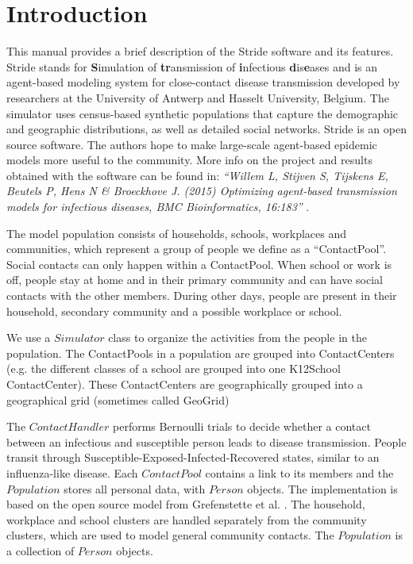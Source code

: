 \chapter{Introduction}
\label{chap:Introduction}
  
This manual provides a brief description of the Stride software and its
features. 
Stride stands for \textbf{S}imulation of \textbf{tr}ansmission 
 of \textbf{i}nfectious \textbf{d}is\textbf{e}ases and is an agent-based modeling 
system for close-contact disease transmission developed by researchers at the
University of Antwerp and Hasselt University, Belgium.
The simulator uses census-based synthetic populations
that capture the demographic and geographic distributions, as well as detailed social networks.
Stride is an open source software. The authors hope to make large-scale
agent-based epidemic models more useful to the community.
More info on the project and results obtained with the software
can be found in: 
\textit{``Willem L, Stijven S, Tijskens E, Beutels P, Hens N \& Broeckhove J. (2015) Optimizing agent-based transmission models for infectious diseases, BMC Bioinformatics, 16:183''} \cite{willem2015}.

The model population consists of households, schools, workplaces and
communities, which represent a group of people we define as a ``ContactPool''.
Social contacts can only happen within a ContactPool. 
When school or work is off, people stay at home and in their primary
community and can have social contacts with the other members.
During other days, people are present in their household, secondary community
and a possible workplace or school.  



We use a $Simulator$ class to organize the activities from the people in the population.
The ContactPools in a population are grouped into ContactCenters (e.g. the different classes of a school are grouped into one K12School ContactCenter).
These ContactCenters are geographically grouped into a geographical grid (sometimes called GeoGrid)

The $Contact Handler$ performs Bernoulli trials to decide whether a contact
between an infectious and susceptible person leads to disease transmission. 
People transit through Susceptible-Exposed-Infected-Recovered states,
similar to an influenza-like disease.
Each $ContactPool$ contains a link to its members and the $Population$ stores all personal
data, with $Person$ objects.
The implementation is based on the open source model from Grefenstette et al. \cite{grefenstette2013}. 
The household, workplace and school clusters are handled separately from the
community clusters, which are used to model general community contacts. The
$Population$ is a collection of $Person$ objects.

